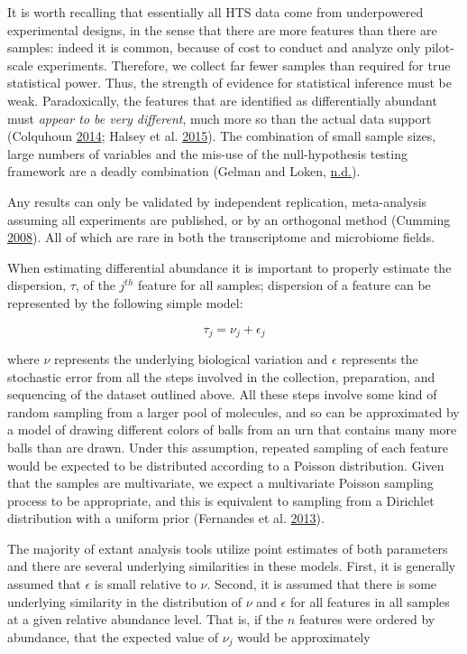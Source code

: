 \documentclass[onecolumn]{book}
\theoremstyle{definition}
\theoremstyle{definition}
\theoremstyle{definition}
\theoremstyle{remark}
\begin{document}
It is worth recalling that essentially all HTS data come from
underpowered experimental designs, in the sense that there are more
features than there are samples: indeed it is common, because of cost to
conduct and analyze only pilot-scale experiments. Therefore, we collect
far fewer samples than required for true statistical power. Thus, the
strength of evidence for statistical inference must be weak.
Paradoxically, the features that are identified as differentially
abundant must \emph{appear to be very different}, much more so than the
actual data support (Colquhoun
\protect\hyperlink{ref-Colquhoun:2014aa}{2014}; Halsey et al.
\protect\hyperlink{ref-Halsey:2015aa}{2015}). The combination of small
sample sizes, large numbers of variables and the mis-use of the
null-hypothesis testing framework are a deadly combination (Gelman and
Loken, \protect\hyperlink{ref-forking:2013}{n.d.}).

Any results can only be validated by independent replication,
meta-analysis assuming all experiments are published, or by an
orthogonal method (Cumming
\protect\hyperlink{ref-Cumming:2008aa}{2008}). All of which are rare in
both the transcriptome and microbiome fields.

When estimating differential abundance it is important to properly
estimate the dispersion, \(\tau\), of the \(j^{th}\) feature for all
samples; dispersion of a feature can be represented by the following
simple model:

\begin{equation}
    \tau_{j} = \nu_j + \epsilon_j
\label{eq:dispersion}
\end{equation}

where \(\nu\) represents the underlying biological variation and
\(\epsilon\) represents the stochastic error from all the steps involved
in the collection, preparation, and sequencing of the dataset outlined
above. All these steps involve some kind of random sampling from a
larger pool of molecules, and so can be approximated by a model of
drawing different colors of balls from an urn that contains many more
balls than are drawn. Under this assumption, repeated sampling of each
feature would be expected to be distributed according to a Poisson
distribution. Given that the samples are multivariate, we expect a
multivariate Poisson sampling process to be appropriate, and this is
equivalent to sampling from a Dirichlet distribution with a uniform
prior (Fernandes et al. \protect\hyperlink{ref-fernandes:2013}{2013}).

The majority of extant analysis tools utilize point estimates of both
parameters and there are several underlying similarities in these
models. First, it is generally assumed that \(\epsilon\) is small
relative to \(\nu\). Second, it is assumed that there is some underlying
similarity in the distribution of \(\nu\) and \(\epsilon\) for all
features in all samples at a given relative abundance level. That is, if
the \(n\) features were ordered by abundance, that the expected value of
\(\nu_j\) would be approximately
\end{document}

